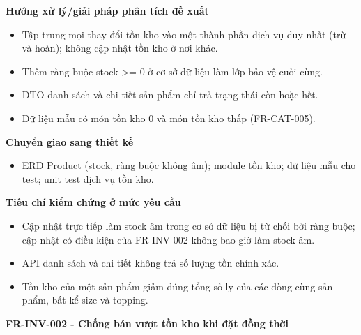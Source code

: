 \documentclass[11pt,a4paper,oneside]{report}
\begin{document}
\textbf{Hướng xử lý/giải pháp phân tích đề xuất}

\begin{itemize}
\item
  Tập trung mọi thay đổi tồn kho vào một thành phần dịch vụ duy nhất (trừ và hoàn); không cập nhật tồn kho ở nơi khác.
\item
  Thêm ràng buộc stock \textgreater= 0 ở cơ sở dữ liệu làm lớp bảo vệ cuối cùng.
\item
  DTO danh sách và chi tiết sản phẩm chỉ trả trạng thái còn hoặc hết.
\item
  Dữ liệu mẫu có món tồn kho 0 và món tồn kho thấp (FR-CAT-005).
\end{itemize}

\textbf{Chuyển giao sang thiết kế}

\begin{itemize}
\item
  ERD Product (stock, ràng buộc không âm); module tồn kho; dữ liệu mẫu cho test; unit test dịch vụ tồn kho.
\end{itemize}

\textbf{Tiêu chí kiểm chứng ở mức yêu cầu}

\begin{itemize}
\item
  Cập nhật trực tiếp làm stock âm trong cơ sở dữ liệu bị từ chối bởi ràng buộc; cập nhật có điều kiện của FR-INV-002 không bao giờ làm stock âm.
\item
  API danh sách và chi tiết không trả số lượng tồn chính xác.
\item
  Tồn kho của một sản phẩm giảm đúng tổng số ly của các dòng cùng sản phẩm, bất kể size và topping.
\end{itemize}

\textbf{FR-INV-002 - Chống bán vượt tồn kho khi đặt đồng thời}
\end{document}
